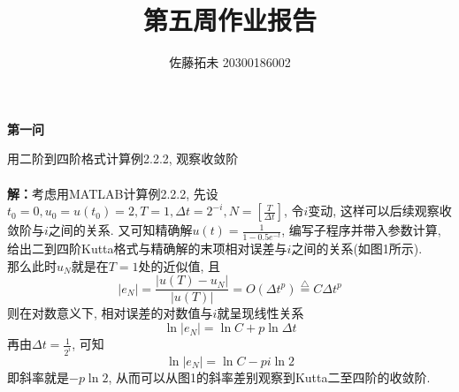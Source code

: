 \documentclass[12pt]{article}
\title{第五周作业报告}
\author{佐藤拓未 20300186002}
\date{}
\begin{document}
	\maketitle
	\begin{center}
		\textbf{第一问}
	\end{center}
用二阶到四阶格式计算例2.2.2, 观察收敛阶\\
\\
\textbf{解：}考虑用MATLAB计算例2.2.2, 先设$t_0=0, u_0=u(t_0)=2, T=1, \Delta{t}=2^{-i}, N= [\frac{T}{\Delta{t}}] $, 令$ i$变动, 这样可以后续观察收敛阶与$i$之间的关系. 又可知精确解$u(t)=\frac{1}{1-0.5e^{-t}}$, 编写子程序并带入参数计算, 给出二到四阶Kutta格式与精确解的末项相对误差与$i$之间的关系(如图1所示).\\
那么此时$u_N$就是在$T=1$处的近似值, 且$$\vert e_N \vert=\frac{\vert u(T)-u_N\vert}{\vert u(T)\vert}=O(\Delta{t}^p)\overset{\triangle}{=}C\Delta{t}^p$$
\noindent 则在对数意义下, 相对误差的对数值与$i$就呈现线性关系 $$\ln \vert e_N\vert = \ln C + p \ln{\Delta{t}} $$
\noindent 再由$\Delta{t}=\frac{1}{2^i}$, 可知 $$\ln \vert e_N\vert = \ln C - pi\ln2$$
\noindent 即斜率就是$-p\ln2$, 从而可以从图1的斜率差别观察到Kutta二至四阶的收敛阶.
\end{document}
